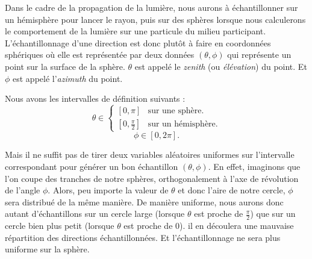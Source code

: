Dans le cadre de la propagation de la lumière, nous aurons à échantillonner sur un hémisphère pour lancer le rayon, puis sur des sphères lorsque nous calculerons le comportement de la lumière sur une particule du milieu participant. L'échantillonnage d'une direction est donc plutôt à faire en coordonnées sphériques où elle est représentée par deux données $(\theta, \phi)$ qui représente un point sur la surface de la sphère. $\theta$ est appelé le \textit{zenith} (ou \textit{élévation}) du point. Et $\phi$ est appelé l'\textit{azimuth} du point.\par
Nous avons les intervalles de définition suivants :
\large \begin{equation*}
    \theta \in \left\{
        \begin{array}{ll}
            \left[ 0, \pi \right] & \text{sur une sphère} .\\
            \left[ 0, \frac{\pi}{2} \right] & \text{sur un hémisphère}.
        \end{array}
    \right.
\end{equation*}
\begin{equation*}
    \phi \in \left[ 0, 2\pi \right]
.\end{equation*} \normalsize \newline\par

Mais il ne suffit pas de tirer deux variables aléatoires uniformes sur l'intervalle correspondant pour générer un bon échantillon $(\theta, \phi)$. En effet, imaginons que l'on coupe des tranches de notre sphères, orthogonalement à l'axe de révolution de l'angle $\phi$. Alors, peu importe la valeur de $\theta$ et donc l'aire de notre cercle, $\phi$ sera distribué de la même manière. De manière uniforme, nous aurons donc autant d'échantillons sur un cercle large (lorsque $\theta$ est proche de $\frac{\pi}{2}$) que sur un cercle bien plus petit (lorsque $\theta$ est proche de $0$). il en découlera une mauvaise répartition des directions échantillonnées. Et l'échantillonnage ne sera plus uniforme sur la sphère.\newline\par

